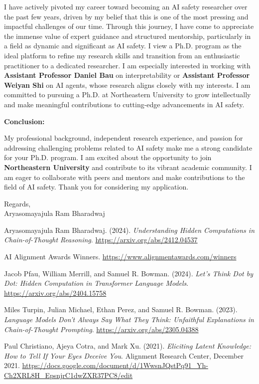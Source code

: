 \documentclass[12pt]{article}
\begin{document}
I have actively pivoted my career toward becoming an AI safety researcher over the past few years, driven by my belief that this is one of the most pressing and impactful challenges of our time. Through this journey, I have come to appreciate the immense value of expert guidance and structured mentorship, particularly in a field as dynamic and significant as AI safety. I view a Ph.D. program as the ideal platform to refine my research skills and transition from an enthusiastic practitioner to a dedicated researcher. I am especially interested in working with \textbf{Assistant Professor Daniel Bau} on interpretability or \textbf{Assistant Professor Weiyan Shi} on AI agents, whose research aligns closely with my interests. I am committed to pursuing a Ph.D. at Northeastern University to grow intellectually and make meaningful contributions to cutting-edge advancements in AI safety.

\textbf{Conclusion:}

My professional background, independent research experience, and passion for addressing challenging problems related to AI safety make me a strong candidate for your Ph.D. program. I am excited about the opportunity to join \textbf{Northeastern University} and contribute to its vibrant academic community. I am eager to collaborate with peers and mentors and make contributions to the field of AI safety. Thank you for considering my application.

Regards,\\
Aryasomayajula Ram Bharadwaj

\newpage
\begin{thebibliography}{9}

Aryasomayajula Ram Bharadwaj. (2024). \emph{Understanding Hidden Computations in Chain-of-Thought Reasoning}.  
\url{https://arxiv.org/abs/2412.04537}

AI Alignment Awards Winners.  
\url{https://www.alignmentawards.com/winners}

Jacob Pfau, William Merrill, and Samuel R. Bowman. (2024). \emph{Let's Think Dot by Dot: Hidden Computation in Transformer Language Models}.  
\url{https://arxiv.org/abs/2404.15758}

Miles Turpin, Julian Michael, Ethan Perez, and Samuel R. Bowman. (2023). \emph{Language Models Don't Always Say What They Think: Unfaithful Explanations in Chain-of-Thought Prompting}.  
\url{https://arxiv.org/abs/2305.04388}

Paul Christiano, Ajeya Cotra, and Mark Xu. (2021). \emph{Eliciting Latent Knowledge: How to Tell If Your Eyes Deceive You}. Alignment Research Center, December 2021.  
\url{https://docs.google.com/document/d/1WwsnJQstPq91_Yh-Ch2XRL8H_EpsnjrC1dwZXR37PC8/edit}

\end{thebibliography}
\end{document}
